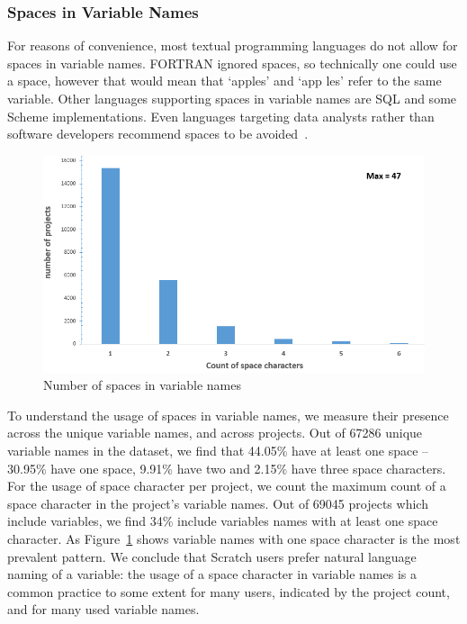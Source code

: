 \documentclass[conference]{IEEEtran}
\begin{document}
\subsubsection{Spaces in Variable Names}
For reasons of convenience, most textual programming languages do not allow for spaces in variable names. 
FORTRAN ignored spaces, so technically one could use a space, however that would mean that `apples' and `app les' refer to the same variable. 
Other languages supporting spaces in variable names are SQL and some Scheme implementations. 
Even languages targeting data analysts rather than software developers recommend spaces to be avoided~\cite{Bochud}.
\begin{figure}
	\begin{center}
		\includegraphics[width=\columnwidth]{fig/project/spaces_in_project}
		\caption{Number of spaces in variable names}
		\label{fig:number_of_spaces}
	\end{center}
\end{figure} 
To understand the usage of spaces in variable names, we measure their presence across the unique variable names, and across projects. Out of 67286 unique variable names in the dataset, we find that 44.05\% have at least one space --30.95\% have one space, 9.91\% have two and 2.15\% have three space characters. For the usage of space character per project, we count the maximum count of a space character in the project's variable names. Out of 69045 projects which include variables, we find 34\% include variables names with at least one space character. As Figure~\ref{fig:number_of_spaces} shows variable names with one space character is the most prevalent pattern. 
We conclude that Scratch users prefer natural language naming of a variable: the usage of a space character in variable names is a common practice to some extent for many users, indicated by the project count, and for many used variable names. 
\end{document}
